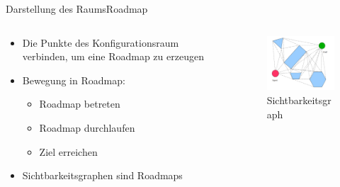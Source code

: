 \documentclass[t,aspectratio=169,dvipsnames]{beamer}
\begin{document}
\begin{frame}{Darstellung des Raums}{Roadmap}
	
	\begin{columns}
		\begin{column}[T]{0.6\textwidth}
			\begin{itemize}
				
				\item Die Punkte des Konfigurationsraum verbinden, um eine Roadmap zu erzeugen
				\item Bewegung in Roadmap:
				\begin{itemize}
					\item Roadmap betreten
					\item Roadmap durchlaufen
					\item Ziel erreichen
				\end{itemize}
				\item Sichtbarkeitsgraphen sind Roadmaps	
			\end{itemize}
		\end{column}
		\begin{column}[T]{0.4\textwidth}
			\begin{figure}
				\includegraphics[width=5.5cm]{images/Bild3.png}
				\caption{Sichtbarkeitsgraph} 

			\end{figure}
		\end{column}
	\end{columns}
\end{frame}
\end{document}
